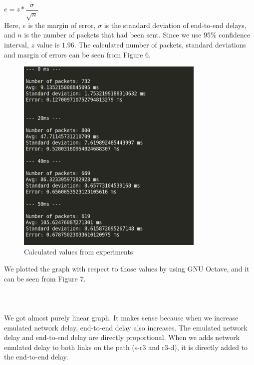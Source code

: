 \documentclass[conference]{IEEEtran}
\begin{document}
$e = z * \dfrac{\sigma}{\sqrt{n}}$ \\

Here, $e$ is the margin of error, $\sigma$ is the standard deviation of end-to-end delays, and $n$ is the number of packets that had been sent. Since we use 95\% confidence interval, $z$ value is $1.96$. The calculated number of packets, standard deviations and margin of errors can be seen from Figure 6. \\

\begin{figure}[htp]
    \centering
    \includegraphics[width=9cm]{bibliography/values.jpeg}
    \caption{Calculated values from experiments}
    \label{fig:values}
\end{figure}




We plotted the graph with respect to those values by using GNU Octave, and it can be seen from Figure 7. \\ \\ \\ \\

We got almost purely linear graph. It makes sense because when we increase emulated network delay, end-to-end delay also increases. The emulated network delay and end-to-end delay are directly proportional. When we adds network emulated delay to both links on the path (s-r3 and r3-d), it is directly added to the end-to-end delay.
\end{document}
